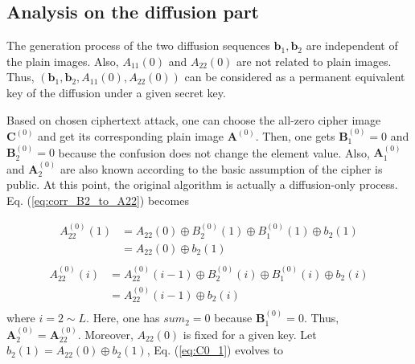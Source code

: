 \documentclass[final,3p,times]{elsarticle}
\begin{document}
\subsection{Analysis on the diffusion part}
The generation process of the two diffusion sequences $\bm{b}_1,\bm{b}_2$ are independent of the plain images. Also, $A_{11}(0)$ and $A_{22}(0)$ are not related to plain images. Thus, $(\bm{b}_1,\bm{b}_2,A_{11}(0),A_{22}(0))$ can be considered as a permanent equivalent key of the diffusion under a given secret key. 


Based on chosen ciphertext attack, one can choose the all-zero cipher image $\bm{C}^{(0)}$ and get its corresponding plain image $\bm{A}^{(0)}$. Then, one gets $\bm{B}_1^{(0)}=0$ and $\bm{B}_2^{(0)}=0$ because the confusion does not change the element value. Also, $\bm{A}_1^{(0)}$ and $\bm{A}_2^{(0)}$ are also known according to the basic assumption of the cipher is public. At this point, the original algorithm is actually a diffusion-only process.
Eq. (\ref{eq:corr_B2_to_A22}) becomes

\begin{equation}
\begin{aligned}
A_{22}^{(0)}(1) & = A_{22}(0) \oplus B_2^{(0)}(1) \oplus B_{1}^{(0)}(1) \oplus b_{2}(1)\\
& = A_{22}(0) \oplus b_{2}(1)\\
\end{aligned}
\label{eq:C0_1}	
\end{equation}
\begin{equation}
\begin{aligned}
A_{22}^{(0)}(i) & = A_{22}^{(0)}(i-1) \oplus B_2^{(0)}(i) \oplus B_{1}^{(0)}(i) \oplus b_{2}(i)\\
& = A_{22}^{(0)}(i-1) \oplus b_{2}(i)\\
\end{aligned}
\label{eq:C0_i}	
\end{equation}
where $i=2 \sim L$. Here, one has $sum_2=0$ because $\bm{B}_1^{(0)}=0$. Thus, $\bm{A}_2^{(0)}=\bm{A}_{22}^{(0)}$. Moreover, $A_{22}(0)$ is fixed for a given key. Let $\hat{b}_{2}(1)=A_{22}(0) \oplus b_{2}(1)$, Eq. (\ref{eq:C0_1}) evolves to
\end{document}
